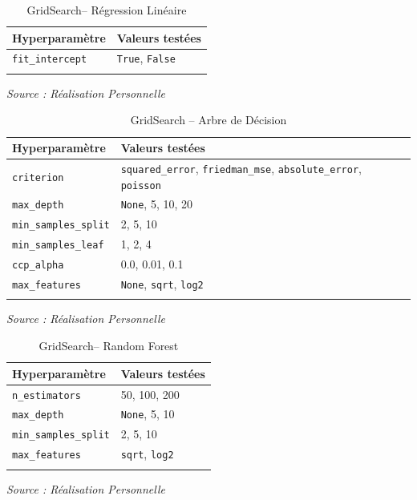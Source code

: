 \documentclass[a4paper,12pt, oneside]{article}
\begin{document}
\begin{longtable}{|p{5cm}|p{12cm}|}
\hline
\textbf{Hyperparamètre} & \textbf{Valeurs testées} \\
\hline

\texttt{fit\_intercept} & \texttt{True}, \texttt{False} \\
\hline
\caption{GridSearch-- Régression Linéaire} 
\end{longtable}
\begin{center}
\vspace{-0.85cm}
\end{center}
\begin{center}
\vspace{-0.85cm}
\textit{Source : Réalisation Personnelle}
\end{center}


\begin{longtable}{|p{5cm}|p{12cm}|}

\hline
\textbf{Hyperparamètre} & \textbf{Valeurs testées} \\
\hline
\texttt{criterion} & \texttt{squared\_error}, \texttt{friedman\_mse}, \texttt{absolute\_error}, \texttt{poisson} \\
\hline
\texttt{max\_depth} & \texttt{None}, 5, 10, 20 \\
\hline
\texttt{min\_samples\_split} & 2, 5, 10 \\
\hline
\texttt{min\_samples\_leaf} & 1, 2, 4 \\
\hline
\texttt{ccp\_alpha} & 0.0, 0.01, 0.1 \\
\hline
\texttt{max\_features} & \texttt{None}, \texttt{sqrt}, \texttt{log2} \\
\hline
\caption{GridSearch -- Arbre de Décision} \\
\end{longtable}
\begin{center}
\vspace{-0.85cm}
\textit{Source : Réalisation Personnelle}
\end{center}

\begin{longtable}{|p{5cm}|p{12cm}|}
\hline
\textbf{Hyperparamètre} & \textbf{Valeurs testées} \\
\hline
\texttt{n\_estimators} & 50, 100, 200 \\
\hline
\texttt{max\_depth} & \texttt{None}, 5, 10 \\
\hline
\texttt{min\_samples\_split} & 2, 5, 10 \\
\hline
\texttt{max\_features} & \texttt{sqrt}, \texttt{log2} \\
\hline
\caption{GridSearch-- Random Forest} \\
\end{longtable}
\begin{center}
\vspace{-0.85cm}
\textit{Source : Réalisation Personnelle}
\end{center}
\end{document}
